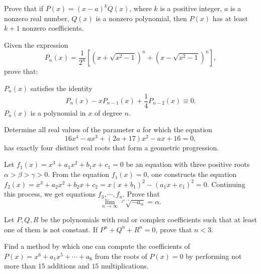 \begin{question}[name={1976 IMO Longlist}]
    Prove that if $P(x) = (x-a)^kQ(x)$, where $k$ is a positive integer, $a$ is a nonzero real number, $Q(x)$ is a nonzero polynomial, then $P(x)$ has at least $k + 1$ nonzero coefficients.
\end{question}

\begin{question}[name={1978 IMO Longlist}]
    Given the expression
\[P_n(x) =\frac{1}{2^n}\left[(x +\sqrt{x^2 - 1})^n+(x-\sqrt{x^2 - 1})^n\right],\]
prove that:
\begin{tasks}
    \task $P_n(x)$ satisfies the identity
    \[P_n(x) - xP_{n-1}(x) + \frac{1}{4}P_{n-2}(x) \equiv 0.\]
    \task $P_n(x)$ is a polynomial in $x$ of degree $n.$
\end{tasks}
\end{question}

\begin{question}[name={1982 IMO Longlist}]
    Determine all real values of the parameter $a$ for which the equation
\[16x^4 -ax^3 + (2a + 17)x^2 -ax + 16 = 0,\]
has exactly four distinct real roots that form a geometric progression.
\end{question}

\begin{question}[name={1984 IMO Longlist}]
    Let $f_1(x) = x^3+a_1x^2+b_1x+c_1 = 0$ be an equation with three positive roots $\alpha>\beta>\gamma > 0$. From the equation $f_1(x) = 0$, one constructs the equation $f_2(x) = x^3 +a_2x^2 +b_2x+c_2 = x(x+b_1)^2 -(a_1x+c_1)^2 = 0$. Continuing this process, we get equations $f_3,\cdots, f_n$. Prove that
\[\lim_{n\to\infty}\sqrt[2^{n-1}]{-a_n} = \alpha.\]
\end{question}

\begin{question}[name={1984 IMO Longlist}]
    Let $P,Q,R$ be the polynomials with real or complex coefficients such that at least one of them is not constant. If $P^n+Q^n+R^n = 0$, prove that $n < 3.$
\end{question}



\begin{question}[name={1985 IMO Longlist}]
    Find a method by which one can compute the coefficients of $P(x) = x^6 + a_1x^5 + \cdots+  a_6$ from the roots of $P(x) = 0$ by performing not more than $15$ additions and $15$ multiplications.
\end{question}

